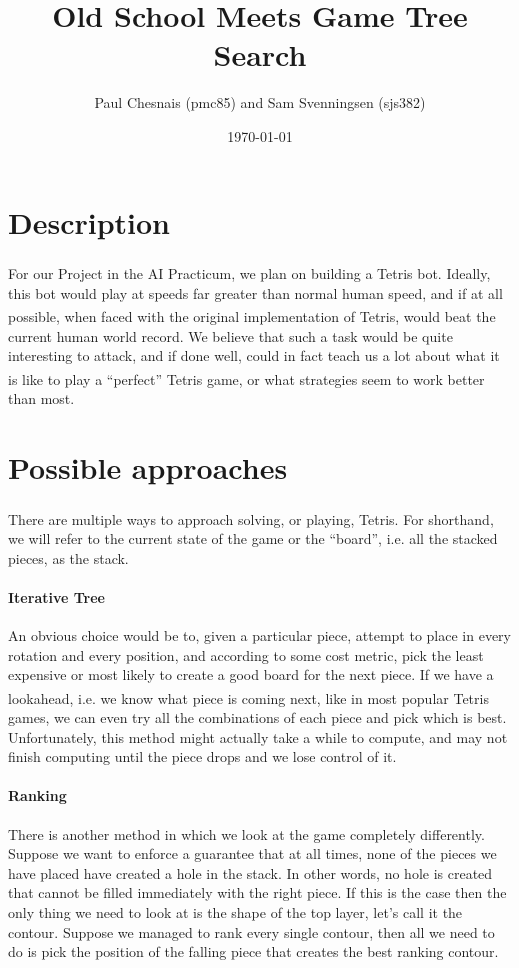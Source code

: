 \documentclass{article}
\title{Old School \tetris{} Meets Game Tree Search}
\author{Paul Chesnais (pmc85) and Sam Svenningsen (sjs382)}
\date{\today}
\def\tetris{Tetris\textsuperscript{\textregistered}}
\begin{document}
\maketitle
\thispagestyle{empty}

\section{Description}

\par For our Project in the AI Practicum, we plan on building a \tetris{} bot. Ideally, this bot would play at speeds far greater than normal human speed, and if at all possible, when faced with the original implementation of \tetris{}, would beat the current human world record. We believe that such a task would be quite interesting to attack, and if done well, could in fact teach us a lot about what it is like to play a ``perfect'' \tetris{} game, or what strategies seem to work better than most.

\section{Possible approaches}

\par There are multiple ways to approach solving, or playing, \tetris{}. For shorthand, we will refer to the current state of the game or the ``board'', i.e. all the stacked pieces, as the stack.

\paragraph{Iterative Tree} An obvious choice would be to, given a particular piece, attempt to place in every rotation and every position, and according to some cost metric, pick the least expensive or most likely to create a good board for the next piece. If we have a lookahead, i.e. we know what piece is coming next, like in most popular \tetris{} games, we can even try all the combinations of each piece and pick which is best. Unfortunately, this method might actually take a while to compute, and may not finish computing until the piece drops and we lose control of it.
\paragraph{Ranking} There is another method in which we look at the game completely differently. Suppose we want to enforce a guarantee that at all times, none of the pieces we have placed have created a hole in the stack. In other words, no hole is created that cannot be filled immediately with the right piece. If this is the case then the only thing we need to look at is the shape of the top layer, let's call it the contour. Suppose we managed to rank every single contour, then all we need to do is pick the position of the falling piece that creates the best ranking contour.
\end{document}
